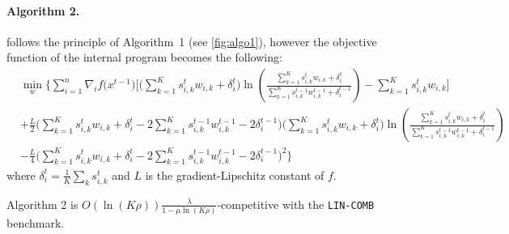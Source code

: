 \paragraph{Algorithm 2.} follows the principle of Algorithm~1 (see \cref{fig:algo1}), however the objective function of the internal program becomes the following:
\begin{align*}
&\min_{w} \biggl\{\sum_{i=1}^{n}
\nabla_{i} f\bigl(x^{t-1} \bigr) \biggl[  \biggl(\sum_{k=1}^{K} s_{i,k}^{t} w_{i,k}  + \delta_{i}^{t} \biggr)
\ln \left(\frac{ \sum_{k=1}^{K} s_{i,k}^{t} w_{i,k}  + \delta_{i}^{t} }{\sum_{k=1}^{K} s_{i,k}^{t-1} w_{i,k}^{t-1} + \delta_{i}^{t-1}}\right)
- \sum_{k=1}^{K}  s_{i,k}^{t} w_{i,k} \biggr] \\
%
&+ \frac{L}{2}\biggl( \sum_{k=1}^{K} s_{i,k}^{t} w_{i,k} + \delta_{i}^{t}  - 2\sum_{k=1}^{K} s_{i,k}^{t-1} w_{i,k}^{t-1} - 2\delta_{i}^{t-1} \biggr) \biggl(\sum_{k=1}^{K} s_{i,k}^{t} w_{i,k} + \delta_{i}^{t} \biggr)
\ln \left(\frac{ \sum_{k=1}^{K} s_{i,k}^{t} w_{i,k}  + \delta_{i}^{t} }{\sum_{k=1}^{K} s_{i,k}^{t-1} w_{i,k}^{t-1}  + \delta_{i}^{t-1}}\right) \\
%
&- \frac{L}{4} \biggl( \sum_{k=1}^{K} s_{i,k}^{t} w_{i,k} + \delta_{i}^{t}  - 2\sum_{k=1}^{K} s_{i,k}^{t-1} w_{i,k}^{t-1} - 2\delta_{i}^{t-1} \biggr)^{2}
\biggr\}
\end{align*}
where $\delta_{i}^{t} = \frac{1}{K} \sum_{k} s_{i,k}^{t}$ and $L$ is the gradient-Lipschitz constant of $f$.

\begin{theorem}
Algorithm 2 is $O(\ln(K \rho)) \frac{\lambda}{1 - \mu \ln (K\rho)}$-competitive with the \texttt{LIN-COMB} benchmark.
\end{theorem}
